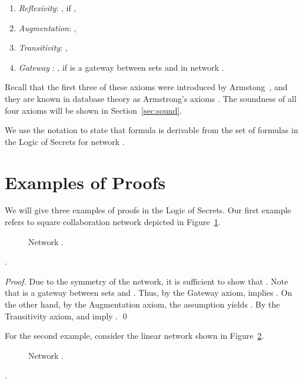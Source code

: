 \documentclass{llncs}
\newcommand{\gateway}{Gateway }
\begin{document}
\begin{enumerate}
\item {\em Reflexivity}: , if ,
\item {\em Augmentation}: ,
\item {\em Transitivity}: ,
\item {\em \gateway}: , if  is a gateway between sets  and  in network .
\end{enumerate}
Recall that the first three of these axioms were introduced by Armstong~\cite{a74}, and they are known in database theory as Armstrong's axioms \cite[p.~81]{guw09}. The soundness of all four axioms will be shown in Section~\ref{sec:sound}.

We use the notation  to state that formula  is derivable from the set of formulas  in the Logic of Secrets for network .


\section{Examples of Proofs}\label{sec:example}
We will give three examples of proofs in the Logic of Secrets. Our first example refers to square collaboration network  depicted in Figure~\ref{square_graph}.

\begin{figure}[htbp]
   \centering
   \caption{Network .}
   \label{square_graph}
\end{figure}



\begin{proposition}\label{square example theorem}
.
\end{proposition}

\begin{proof}
Due to the symmetry of the network, it is sufficient to show that .
Note that  is a gateway between sets  and . Thus, by the \gateway axiom,
 implies . On the other hand, by the Augmentation axiom, the assumption  yields . 
By the Transitivity axiom,   and  imply . \qed
\end{proof}
For the second example, consider the linear network  shown in Figure~\ref{linear_graph_5edges}.
\begin{figure}[htbp]
   \centering
   \caption{Network .}
   \label{linear_graph_5edges}
\end{figure}


\begin{proposition}\label{linear example theorem}
.
\end{proposition}
\end{document}
